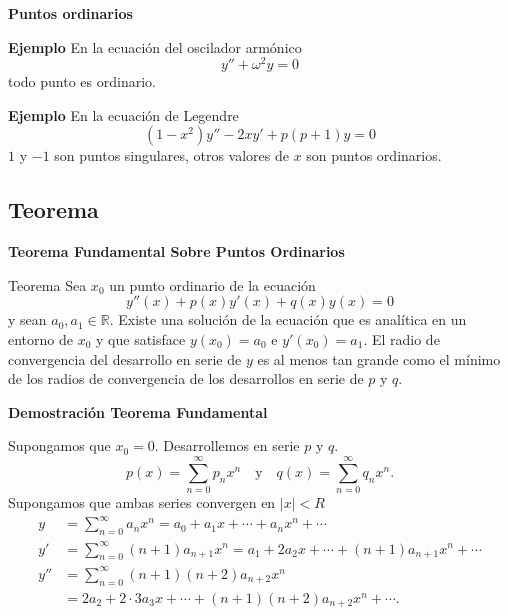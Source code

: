 \begin{frame}[fragile]{\textbf{Puntos ordinarios}}

\textbf{Ejemplo } En la ecuación del oscilador armónico
\[y''+\omega^2 y=0 \]
todo punto es ordinario.


\textbf{Ejemplo } En la ecuación de Legendre
\[(1-x^2)y''-2xy'+p(p+1)y=0 \]
$1$ y $-1$ son puntos singulares, otros valores de $x$ son puntos ordinarios.
\end{frame}
\subsection{Teorema }

\begin{frame}[fragile]{\textbf{Teorema Fundamental Sobre Puntos Ordinarios}}
\begin{block}{Teorema} Sea $x_0$ un punto ordinario de la ecuación
\[y''(x)+p(x)y'(x)+q(x)y(x)=0\]
y sean $a_0,a_1\in\mathbb{R}$. Existe una solución de la ecuación que es analítica en un entorno de $x_0$ y que satisface $y(x_0)=a_0$ e $y'(x_0)=a_1$. El radio de convergencia del desarrollo en serie de $y$ es al menos tan grande como el mínimo de los radios de convergencia de los desarrollos en serie de $p$ y $q$.
\end{block}

\end{frame}




\begin{frame}[fragile]{\textbf{Demostración Teorema Fundamental}}

Supongamos que $x_0=0$. Desarrollemos en serie  $p$ y $q$.
\begin{equation}\label{eq:series_p_q}p(x)=\sum_{n=0}^{\infty}p_nx^n\quad\text{y}\quad q(x)=\sum_{n=0}^{\infty}q_nx^n.
\end{equation}
Supongamos que ambas series convergen en $|x|<R$
{\small
\[
    \begin{split}
      y&=\sum_{n=0}^{\infty}a_nx^n=a_0+a_1x+\cdots+a_nx^n+\cdots\\
      y'&=\sum_{n=0}^{\infty}(n+1)a_{n+1}x^n=a_1+2a_2x+\cdots+(n+1)a_{n+1}x^n+\cdots\\
      y''&=\sum_{n=0}^{\infty}(n+1)(n+2)a_{n+2}x^n\\
      &= 2a_2+2\cdot 3a_3x+\cdots+(n+1)(n+2)a_{n+2}x^n+\cdots.
    \end{split}
\]
}

\end{frame}

